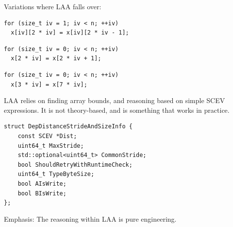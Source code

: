 \documentclass{beamer}
\begin{document}
\begin{frame}[containsverbatim]
  Variations where LAA falls over:

  \vspace{1em}

  \begin{verbatim}
for (size_t iv = 1; iv < n; ++iv)
  x[iv][2 * iv] = x[iv][2 * iv - 1];
  \end{verbatim}

  \vspace{1em}

  \begin{verbatim}
for (size_t iv = 0; iv < n; ++iv)
  x[2 * iv] = x[2 * iv + 1];
  \end{verbatim}

  \vspace{1em}

  \begin{verbatim}
for (size_t iv = 0; iv < n; ++iv)
  x[3 * iv] = x[7 * iv];
  \end{verbatim}

  \vspace{1em}

  LAA relies on finding array bounds, and reasoning based on simple SCEV expressions. It is not theory-based, and is something that works in practice.
\end{frame}

\begin{frame}[containsverbatim]
  \begin{verbatim}
struct DepDistanceStrideAndSizeInfo {
    const SCEV *Dist;
    uint64_t MaxStride;
    std::optional<uint64_t> CommonStride;
    bool ShouldRetryWithRuntimeCheck;
    uint64_t TypeByteSize;
    bool AIsWrite;
    bool BIsWrite;
};
  \end{verbatim}

  \vspace{1em}

  Emphasis: The reasoning within LAA is pure engineering.
\end{frame}
\end{document}

